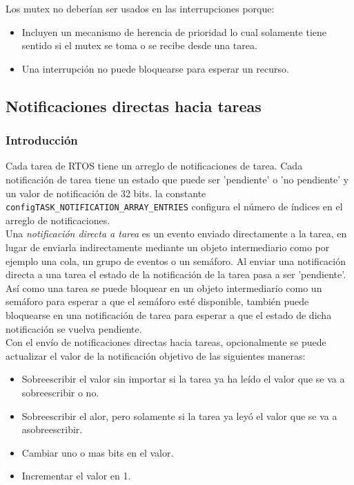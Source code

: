 Los mutex no deberían ser usados en las interrupciones porque:

\begin{itemize}
    \item Incluyen un mecanismo de herencia de prioridad lo cual solamente tiene sentido si el mutex se toma o se recibe desde una tarea.
    \item Una interrupción no puede bloquearse para esperar un recurso.
\end{itemize}

\subsection{Notificaciones directas hacia tareas}

\subsubsection{Introducción}

Cada tarea de RTOS tiene un arreglo de notificaciones de tarea. Cada notificación de tarea tiene un estado que puede ser 'pendiente' o 'no pendiente' y un valor de notificación de 32 bits. la constante \texttt{configTASK\_NOTIFICATION\_ARRAY\_ENTRIES} configura el número de índices en el arreglo de notificaciones.\\

Una \textit{notificación directa a tarea} es un evento enviado directamente a la tarea, en lugar de enviarla indirectamente mediante un objeto intermediario como por ejemplo una cola, un grupo de eventos o un semáforo. Al enviar una notificación directa a una tarea el estado de la notificación de la tarea pasa a ser 'pendiente'. Así como una tarea se puede bloquear en un objeto intermediario como un semáforo para esperar a que el semáforo esté disponible, también puede bloquearse en una notificación de tarea para esperar a que el estado de dicha notificación se vuelva pendiente.\\

Con el envío de notificaciones directas hacia tareas, opcionalmente se puede actualizar el valor de la notificación objetivo de las siguientes maneras:

\begin{itemize}
    \item Sobreescribir el valor sin importar si la tarea ya ha leído el valor que se va a sobreescribir o no.
    \item Sobreescribir el alor, pero solamente si la tarea ya leyó el valor que se va a asobreescribir.
    \item Cambiar uno o mas bits en el valor.
    \item Incrementar el valor en 1.
\end{itemize}

